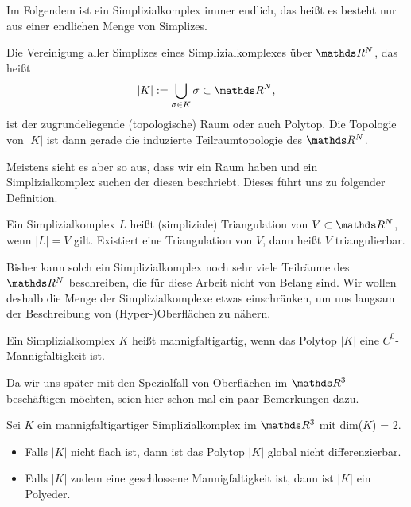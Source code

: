     Im Folgendem ist ein Simplizialkomplex immer endlich, das heißt es besteht nur aus einer endlichen Menge von Simplizes.

    \begin{definition}
      Die Vereinigung aller Simplizes eines Simplizialkomplexes über \( \R^{N} \), das heißt
      \begin{align}
        |K| := \bigcup_{\sigma \in K} \sigma \subset \R^{N} \text{,}
      \end{align}
      ist der zugrundeliegende (topologische) Raum oder auch Polytop.
      Die Topologie von \( |K| \) ist dann gerade die induzierte Teilraumtopologie des \( \R^{N} \).
    \end{definition}
    
    Meistens sieht es aber so aus, dass wir ein Raum haben und ein Simplizialkomplex suchen der diesen beschriebt.
    Dieses führt uns zu folgender Definition.

    \begin{definition}
      Ein Simplizialkomplex \( L \) heißt (simpliziale) Triangulation von \( V \subset \R^{N} \), wenn \( |L| = V \) gilt.
      Existiert eine Triangulation von \( V \), dann heißt \( V \) triangulierbar.
    \end{definition}

    Bisher kann solch ein Simplizialkomplex noch sehr viele Teilräume des \( \R^{N} \) beschreiben, die für diese Arbeit nicht von Belang sind. 
    Wir wollen deshalb die Menge der Simplizialkomplexe etwas einschränken, um uns langsam der Beschreibung von 
    \mbox{(Hyper-)Oberflächen} zu nähern.

    \begin{definition}
      Ein Simplizialkomplex \( K \) heißt mannigfaltigartig, wenn das Polytop \( |K| \) eine \( C^{0} \)-Mannigfaltigkeit ist.
    \end{definition}

    Da wir uns später mit den Spezialfall von Oberflächen im \( \R^{3} \) beschäftigen möchten, seien hier schon mal ein paar Bemerkungen dazu.
    
    \begin{bemerkung}
      Sei \( K \) ein mannigfaltigartiger Simplizialkomplex im \( \R^{3} \) mit dim(\( K \)) = 2.
      \begin{itemize}
        \item Falls \( |K| \) nicht flach ist, dann ist das Polytop \( |K| \) global nicht differenzierbar.
        \item Falls \( |K| \) zudem eine geschlossene Mannigfaltigkeit ist, dann ist \( |K| \) ein Polyeder.
      \end{itemize}
    \end{bemerkung}

